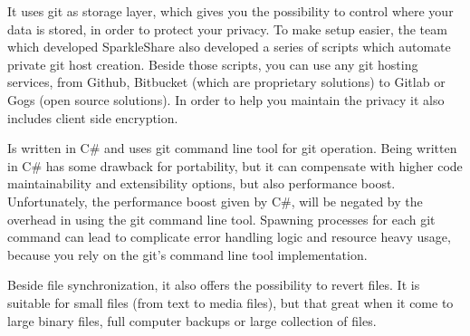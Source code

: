         It uses git as storage layer, which gives you the possibility to control where your data is stored, in order to protect your privacy. To make setup easier, the team which developed SparkleShare also developed a series of scripts which automate private git host creation. Beside those scripts, you can use any git hosting services, from Github, Bitbucket (which are proprietary solutions) to Gitlab or Gogs (open source solutions).
        In order to help you maintain the privacy it also includes client side encryption.
        
        Is written in C\# and uses git command line tool for git operation. Being written in C\# has some drawback for portability, but it can compensate with higher code maintainability and extensibility options, but also performance boost. Unfortunately, the performance boost given by C\#, will be negated by the overhead in using the git command line tool. Spawning processes for each git command can lead to complicate error handling logic and resource heavy usage, because you rely on the git's command line tool implementation.
        
        Beside file synchronization, it also offers the possibility to revert files. It is suitable for small files (from text to media files), but that great when it come to large binary files, full computer backups or large collection of files. 